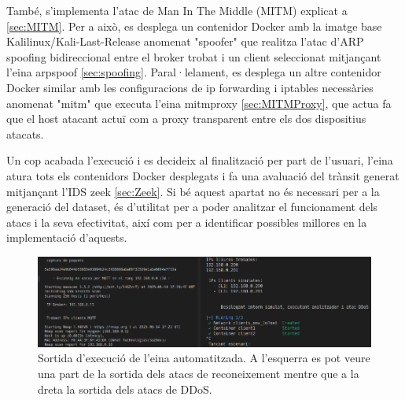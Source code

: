 També, s'implementa l'atac de Man In The Middle (MITM) explicat a \ref{sec:MITM}. Per a això, es desplega un contenidor Docker amb la imatge base Kalilinux/Kali-Last-Release anomenat "spoofer" que realitza l'atac d'ARP spoofing bidireccional entre el broker trobat i un client seleccionat mitjançant l'eina arpspoof \ref{sec:spoofing}. Paral·lelament, es desplega un altre contenidor Docker similar amb les configuracions de ip forwarding i iptables necessàries anomenat "mitm" que executa l'eina mitmproxy \ref{sec:MITMProxy}, que actua fa que el host atacant actuï com a proxy transparent entre els dos dispositius atacats.

Un cop acabada l'execució i es decideix al finalització per part de l'usuari, l'eina atura tots els contenidors Docker desplegats i fa una avaluació del trànsit generat mitjançant l'IDS zeek \ref{sec:Zeek}. Si bé aquest apartat no és necessari per a la generació del dataset, és d'utilitat per a poder analitzar el funcionament dels atacs i la seva efectivitat, així com per a identificar possibles millores en la implementació d'aquests.

  \begin{figure}[H]
    \centering
    \includegraphics[width=1\textwidth]{img/tool.png}
    \caption{Sortida d'execució de l'eina automatitzada. A l'esquerra es pot veure una part de la sortida dels atacs de reconeixement mentre que a la dreta la sortida dels atacs de DDoS.}
    \label{fig:tool}
  \end{figure}
